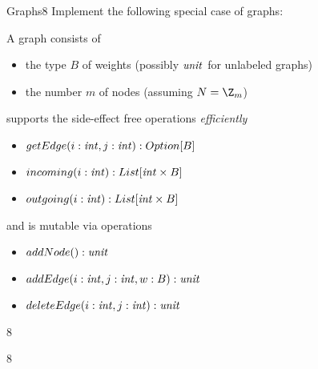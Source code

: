 \documentclass[a4paper]{article}
\begin{document}
\header


\begin{problem}{Graphs}{8}
Implement the following special case of graphs:

A graph consists of 
\begin{itemize}
 \item the type $B$ of weights (possibly $\mathit{unit}$ for unlabeled graphs)
 \item the number $m$ of nodes (assuming $N=\Z_m$)
\end{itemize}
supports the side-effect free operations \emph{efficiently}
\begin{itemize}
 \item $getEdge(i:\mathit{int},j:\mathit{int}):Option[B]$
 \item $incoming(i:\mathit{int}):List[\mathit{int}\times B]$
 \item $outgoing(i:\mathit{int}):List[\mathit{int}\times B]$
\end{itemize}
and is mutable via operations
\begin{itemize}
 \item $addNode():\mathit{unit}$
 \item $addEdge(i:\mathit{int},j:\mathit{int},w:B):\mathit{unit}$
 \item $deleteEdge(i:\mathit{int},j:\mathit{int}):\mathit{unit}$
\end{itemize}
\end{problem}

\begin{problem}{}{8}
\end{problem}

\begin{problem}{}{8}

\end{problem}
\end{document}
